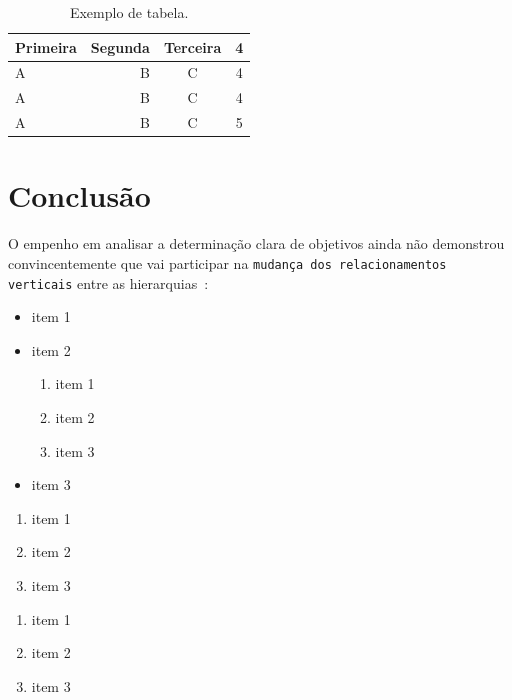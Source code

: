 \documentclass{article}
\begin{document}
\begin{table}[h]
    \centering
    \caption{Exemplo de tabela.}
    \label{tab:exemplo1}  
     
    \begin{tabular}{l||r|c|c}
        \hline
        \textbf{Primeira}  & \textbf{Segunda}  & \textbf{Terceira} & \textbf{4} \\\hline\hline
    
        A & B & C & 4\\ \hline
        A & B & C & 4\\ \hline
        A & B & C & 5\\ \hline
    \end{tabular}
 
\end{table}

\section{Conclusão}

O empenho em analisar a determinação clara de objetivos ainda não demonstrou convincentemente que vai participar na \texttt{mudança dos relacionamentos verticais} entre as hierarquias~\cite{berg2006logica}:

\begin{itemize}
    \item item 1
    \item item 2
    \begin{enumerate}
        \item item 1~\cite{forbellone2000logica,de2006algoritmos}
        \item item 2
        \item item 3
    \end{enumerate}
    \item item 3
\end{itemize}

\begin{enumerate}
    \item item 1
    \item item 2
    \item item 3
\end{enumerate}

\begin{enumerate}[\hspace{2cm} i.]
    \item item 1
    \item item 2
    \item item 3
\end{enumerate}
   
   


   
   
   
\end{document}
